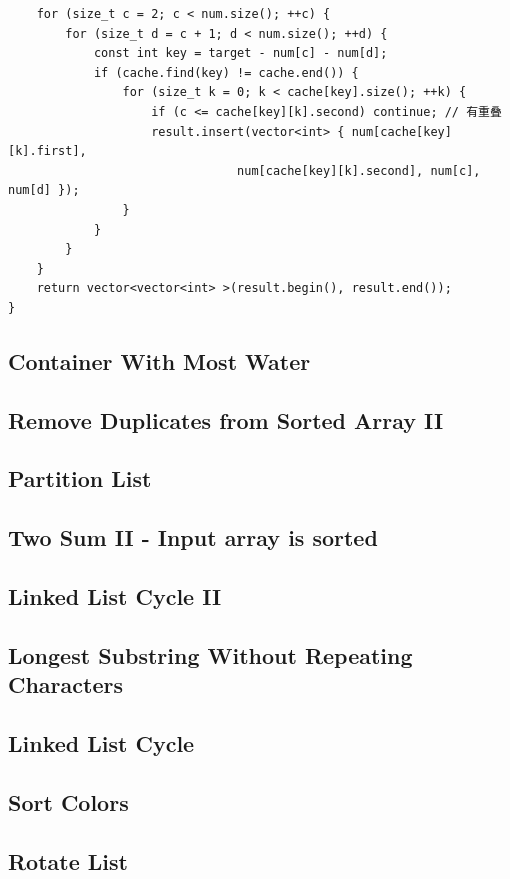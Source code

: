 \documentclass[12pt]{book}
\begin{document}
\begin{enumerate}
\begin{lstlisting}
    for (size_t c = 2; c < num.size(); ++c) {
        for (size_t d = c + 1; d < num.size(); ++d) {
            const int key = target - num[c] - num[d];
            if (cache.find(key) != cache.end()) {
                for (size_t k = 0; k < cache[key].size(); ++k) {
                    if (c <= cache[key][k].second) continue; // 有重叠
                    result.insert(vector<int> { num[cache[key][k].first],
                                num[cache[key][k].second], num[c], num[d] });
                }
            }
        }
    }
    return vector<vector<int> >(result.begin(), result.end());
}
\end{lstlisting}
\end{enumerate}

\subsection{Container With Most Water}
\label{sec-15-2-4}
\subsection{Remove Duplicates from Sorted Array II}
\label{sec-15-2-5}
\subsection{Partition List}
\label{sec-15-2-6}
\subsection{Two Sum II - Input array is sorted}
\label{sec-15-2-7}
\subsection{Linked List Cycle II}
\label{sec-15-2-8}
\subsection{Longest Substring Without Repeating Characters}
\label{sec-15-2-9}
\subsection{Linked List Cycle}
\label{sec-15-2-10}
\subsection{Sort Colors}
\label{sec-15-2-11}
\subsection{Rotate List}
\label{sec-15-2-12}
\end{document}
